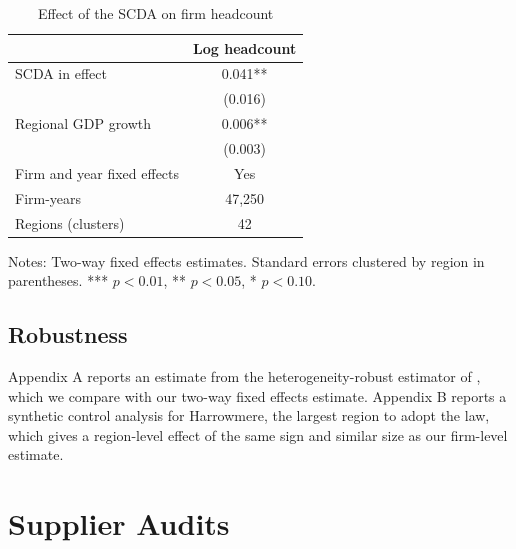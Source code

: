 \documentclass[11pt]{article}
\begin{document}
\begin{table}[ht]
\centering
\begin{threeparttable}
\caption{Effect of the SCDA on firm headcount}
\label{tab:staff}
\small
\begin{tabular}{lc}
\toprule
 & Log headcount \\
\midrule
SCDA in effect & 0.041** \\
 & (0.016) \\
Regional GDP growth & 0.006** \\
 & (0.003) \\
\midrule
Firm and year fixed effects & Yes \\
Firm-years & 47,250 \\
Regions (clusters) & 42 \\
\bottomrule
\end{tabular}
\begin{tablenotes}\footnotesize
\item Notes: Two-way fixed effects estimates. Standard errors clustered by region in parentheses. *** $p<0.01$, ** $p<0.05$, * $p<0.10$.
\end{tablenotes}
\end{threeparttable}
\end{table}

\subsection{Robustness}

Appendix A reports an estimate from the heterogeneity-robust estimator of \citet{cs2021}, which we compare with our two-way fixed effects estimate. Appendix B reports a synthetic control analysis for Harrowmere, the largest region to adopt the law, which gives a region-level effect of the same sign and similar size as our firm-level estimate.

\section{Supplier Audits}
\end{document}

